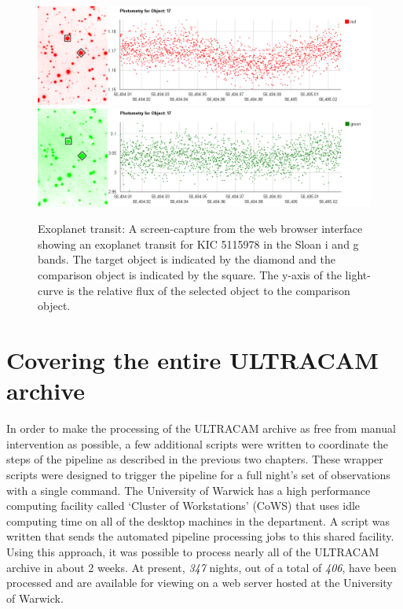 \begin{figure}
\centering
\includegraphics[width=150mm]{images/koi823-r-lc.png}
\includegraphics[width=150mm]{images/koi823-g-lc.png}
\caption{Exoplanet transit: A screen-capture from the web browser interface showing an exoplanet transit for KIC 5115978 in the Sloan i and g bands. The target object is indicated by the diamond and the comparison object is indicated by the square. The y-axis of the light-curve is the relative flux of the selected object to the comparison object.}
\label{fig:gumus-discovery}
\end{figure}


\section{Covering the entire ULTRACAM archive}
In order to make the processing of the ULTRACAM archive as free from manual intervention as possible, a few additional scripts were written to coordinate the steps of the pipeline as described in the previous two chapters. These wrapper scripts were designed to trigger the pipeline for a full night's set of observations with a single command. The University of Warwick has a high performance computing facility called `Cluster of Workstations' (CoWS) that uses idle computing time on all of the desktop machines in the department. A script was written that sends the automated pipeline processing jobs to this shared facility. Using this approach, it was possible to process nearly all of the ULTRACAM archive in about 2 weeks. At present, \emph{347} nights, out of a total of \emph{406}, have been processed and are available for viewing on a web server hosted at the University of Warwick. 

